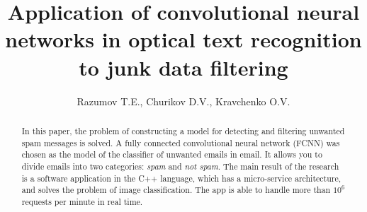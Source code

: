 \documentclass[12pt]{jpconf}
\begin{document}
\title{Application of convolutional neural networks in optical text recognition to junk data filtering}
\author{Razumov T.E., Churikov D.V., Kravchenko O.V.}

\address{Production Editor, \jpcs, \iopp, Dirac House, Temple Back, Bristol BS1~6BE, UK}



\begin{abstract}
	In this paper, the problem of constructing a model for detecting and filtering unwanted spam messages is solved. A fully connected convolutional neural network (\textsf{FCNN}) was chosen as the model of the classifier of unwanted emails in email. It allows you to divide emails into two categories: \emph{spam} and \emph{not spam}.
	The main result of the research is a software application in the \textsf{C++} language, which has a micro-service architecture, and solves the problem of image classification. The app is able to handle more than $10 ^ 6 $ requests per minute in real time.
\end{abstract}

\end{document}

